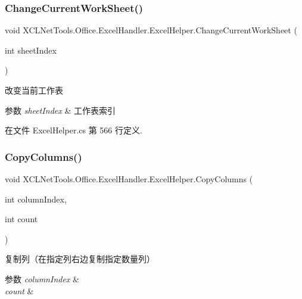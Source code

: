 \subsubsection{\texorpdfstring{Change\+Current\+Work\+Sheet()}{ChangeCurrentWorkSheet()}}
{\footnotesize\ttfamily void X\+C\+L\+Net\+Tools.\+Office.\+Excel\+Handler.\+Excel\+Helper.\+Change\+Current\+Work\+Sheet (\begin{DoxyParamCaption}\item[{int}]{sheet\+Index }\end{DoxyParamCaption})}



改变当前工作表 


\begin{DoxyParams}{参数}
{\em sheet\+Index} & 工作表索引\\
\hline
\end{DoxyParams}


在文件 Excel\+Helper.\+cs 第 566 行定义.

\mbox{\label{class_x_c_l_net_tools_1_1_office_1_1_excel_handler_1_1_excel_helper_a8755580f71c387120cc4e84260ac22dc}} 
\subsubsection{\texorpdfstring{Copy\+Columns()}{CopyColumns()}\hspace{0.1cm}{\footnotesize\ttfamily [1/2]}}
{\footnotesize\ttfamily void X\+C\+L\+Net\+Tools.\+Office.\+Excel\+Handler.\+Excel\+Helper.\+Copy\+Columns (\begin{DoxyParamCaption}\item[{int}]{column\+Index,  }\item[{int}]{count }\end{DoxyParamCaption})}



复制列（在指定列右边复制指定数量列） 


\begin{DoxyParams}{参数}
{\em column\+Index} & \\
\hline
{\em count} & \\
\hline
\end{DoxyParams}


